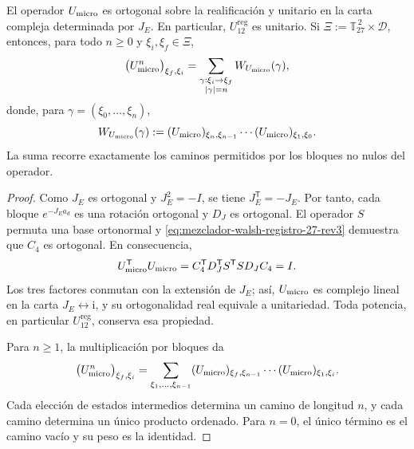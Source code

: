 \begin{proposition}
\label{prop:unitariedad-suma-registro-27-rev3}
El operador \(U_{\rm micro}\) es ortogonal sobre la realificación y unitario
en la carta compleja determinada por \(J_E\). En particular,
\(U_{12}^{\mathrm{reg}}\) es unitario. Si
\(\Xi:=\mathbb T_{27}^{\,2}\times\mathcal D\), entonces, para todo
\(n\geq0\) y \(\xi_i,\xi_f\in\Xi\),
\[
 \bigl(U_{\rm micro}^{n}\bigr)_{\xi_f,\xi_i}
 =
 \sum_{\substack{\gamma:\xi_i\to\xi_f\\|\gamma|=n}}
 W_{U_{\rm micro}}(\gamma),
\]
donde, para \(\gamma=(\xi_0,\ldots,\xi_n)\),
\[
 W_{U_{\rm micro}}(\gamma)
 :=
 (U_{\rm micro})_{\xi_n,\xi_{n-1}}
 \cdots
 (U_{\rm micro})_{\xi_1,\xi_0}.
\]
La suma recorre exactamente los caminos permitidos por los bloques no nulos
del operador.
\end{proposition}

\begin{proof}
Como \(J_E\) es ortogonal y \(J_E^2=-I\), se tiene
\(J_E^{\mathsf T}=-J_E\). Por tanto, cada bloque
\(e^{-J_Ea_d}\) es una rotación ortogonal y \(D_J\) es ortogonal.
El operador \(S\) permuta una base ortonormal y
\eqref{eq:mezclador-walsh-registro-27-rev3} demuestra que \(C_4\) es
ortogonal. En consecuencia,
\[
 U_{\rm micro}^{\mathsf T}U_{\rm micro}
 =C_4^{\mathsf T}D_J^{\mathsf T}S^{\mathsf T}
   S D_JC_4
 =I.
\]
Los tres factores conmutan con la extensión de \(J_E\); así,
\(U_{\rm micro}\) es complejo lineal en la carta
\(J_E\leftrightarrow\mathrm i\), y su ortogonalidad real equivale a
unitariedad. Toda potencia, en particular
\(U_{12}^{\mathrm{reg}}\), conserva esa propiedad.

Para \(n\geq1\), la multiplicación por bloques da
\[
 \bigl(U_{\rm micro}^{n}\bigr)_{\xi_f,\xi_i}
 =
 \sum_{\xi_1,\ldots,\xi_{n-1}}
 (U_{\rm micro})_{\xi_f,\xi_{n-1}}
 \cdots
 (U_{\rm micro})_{\xi_1,\xi_i}.
\]
Cada elección de estados intermedios determina un camino de longitud \(n\),
y cada camino determina un único producto ordenado. Para \(n=0\), el único
término es el camino vacío y su peso es la identidad.
\end{proof}

